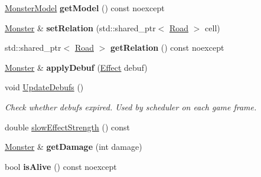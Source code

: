 \begin{DoxyCompactItemize}
\item 
\mbox{\label{classbase__structures_1_1Monster_a5e49f6153f1fce7d0f99f875b4bc543f}} 
\hyperlink{group__monster__interface_ga92d84ad7c1ff9ec724366d3b4d0de044}{Monster\+Model} {\bfseries get\+Model} () const noexcept
\item 
\mbox{\label{classbase__structures_1_1Monster_a5a7f23d09ed103a42288ef6a2c1bf3d1}} 
\hyperlink{classbase__structures_1_1Monster}{Monster} \& {\bfseries set\+Relation} (std\+::shared\+\_\+ptr$<$ \hyperlink{classbase__structures_1_1Road}{Road} $>$ cell)
\item 
\mbox{\label{classbase__structures_1_1Monster_a2b3e8fd08f5180dfdb7fdc713116c523}} 
std\+::shared\+\_\+ptr$<$ \hyperlink{classbase__structures_1_1Road}{Road} $>$ {\bfseries get\+Relation} () const noexcept
\item 
\mbox{\label{classbase__structures_1_1Monster_a20b0650ed5255d27f9d19776192eead4}} 
\hyperlink{classbase__structures_1_1Monster}{Monster} \& {\bfseries apply\+Debuf} (\hyperlink{structbase__structures_1_1Effect}{Effect} debuf)
\item 
\mbox{\label{classbase__structures_1_1Monster_acdec092b9fcb38bc8638611e575ba667}} 
void \hyperlink{classbase__structures_1_1Monster_acdec092b9fcb38bc8638611e575ba667}{Update\+Debufs} ()
\begin{DoxyCompactList}\small\item\em Check whether debufs expired. Used by scheduler on each game frame. \end{DoxyCompactList}\item 
double \hyperlink{classbase__structures_1_1Monster_ad778a77546fd31bdb4125f7b150211c9}{slow\+Effect\+Strength} () const
\item 
\mbox{\label{classbase__structures_1_1Monster_af00fc680b342d1593894928d8636cb8e}} 
\hyperlink{classbase__structures_1_1Monster}{Monster} \& {\bfseries get\+Damage} (int damage)
\item 
\mbox{\label{classbase__structures_1_1Monster_af6822bf8011532b4d38aea21937ffd9a}} 
bool {\bfseries is\+Alive} () const noexcept
\end{DoxyCompactItemize}
